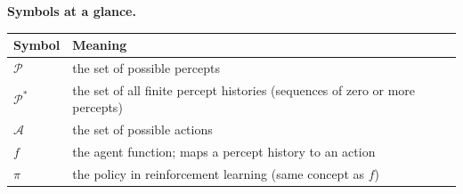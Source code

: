 \documentclass[a4paper,11pt]{article}
\begin{document}
\medskip
\noindent\textbf{Symbols at a glance.}
\begin{center}\small
\begin{tabular}{@{}ll@{}}
\toprule
\textbf{Symbol} & \textbf{Meaning} \\
\midrule
$\mathcal{P}$       & the set of possible percepts \\
$\mathcal{P}^{*}$   & the set of all finite percept histories (sequences of zero or more percepts) \\
$\mathcal{A}$       & the set of possible actions \\
$f$                 & the agent function; maps a percept history to an action \\
$\pi$               & the policy in reinforcement learning (same concept as $f$) \\
\bottomrule
\end{tabular}
\end{center}
\end{document}
